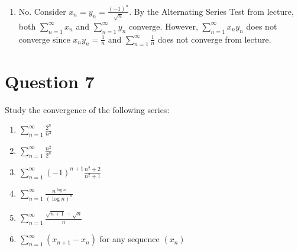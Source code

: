 \documentclass[13pt]{article}
\begin{document}
\begin{enumerate}[label=(\alph*)]
\item No. Consider $x_n = y_n = \frac{(-1)^n}{\sqrt{n}}$. By the
  Alternating Series Test from lecture, both $\sum_{n = 1}^{\infty}
  x_n$ and $ \sum_{n = 1}^{\infty} y_n$ converge. However, $\sum_{n =
    1}^{\infty} x_ny_n$ does not converge since $x_ny_n = \frac{1}{n}$
  and $\sum_{n = 1}^{\infty} \frac{1}{n}$ does not converge from lecture.
\end{enumerate}


\newpage
\section*{Question 7}
Study the convergence of the following series:
\begin{enumerate}[label=(\alph*)]
\item $\sum_{n = 1}^{\infty} \frac{2^n}{n^2}$
\item $\sum_{n = 1}^{\infty} \frac{n^2}{2^n}$
\item $\sum_{n = 1}^{\infty} (-1)^{n + 1} \frac{n^2 + 2}{n^2 + 1}$
\item $\sum_{n = 1}^{\infty} \frac{n^{\log n}}{(\log n)^n}$
\item $\sum_{n = 1}^{\infty} \frac{\sqrt{n + 1} - \sqrt{n}}{n}$
\item $\sum_{n = 1}^{\infty} (x_{n + 1} - x_n)$ for any sequence $(x_n)$
\end{enumerate}
\end{document}
